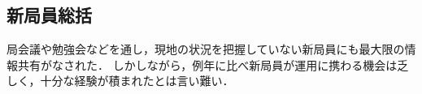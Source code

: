 \subsection*{新局員総括}


局会議や勉強会などを通し，現地の状況を把握していない新局員にも最大限の情報共有がなされた．
しかしながら，例年に比べ新局員が運用に携わる機会は乏しく，十分な経験が積まれたとは言い難い．
